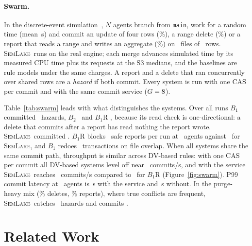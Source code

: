 \documentclass[sigconf, nonacm]{acmart}
\newcommand{\systemname}{\textsc{SemLake}}
\begin{document}
\paragraph{Swarm.} In the discrete-event simulation~\cite{git4data2026, ang2026branchbench, zhou2026chronos, lyu2026atr}, $N$ agents branch from \texttt{main}, work for a random time (mean \SwarmWorkMean\,s) and commit an update of four rows (\SwarmUpdatePct\%), a range delete (\SwarmDeletePct\%) or a report that reads a range and writes an aggregate (\SwarmReportPct\%) on \SwarmFiles\ files of \SwarmRowsPerFile\ rows. \systemname\ runs on the real engine; each merge advances simulated time by its measured CPU time plus its requests at the S3 medians, and the baselines are rule models under the same charges. A report and a delete that ran concurrently over shared rows are a \emph{hazard} if both commit. Every system is run with one CAS per commit and with the same commit service ($G = 8$).

Table~\ref{tab:swarm} leads with what distinguishes the systems. Over all runs $B_1$ committed \SwarmBoneHazTotal\ hazards, $B_2$ \SwarmBtwoHazTotal\ and $B_1\text{R}$ \SwarmBoneRHazTotal, because its read check is one-directional: a delete that commits after a report has read nothing the report wrote. \systemname\ committed \textbf{\SwarmSemHazTotal}. $B_1\text{R}$ blocks \SwarmBoneRFBMax\ safe reports per run at \SwarmMaxAgents\ agents against \SwarmSemFBMax\ for \systemname, and $B_1$ redoes \SwarmBoneRedoMax\ transactions on file overlap. When all systems share the same commit path, throughput is similar across DV-based rules: with one CAS per commit all DV-based systems level off near \SwarmSemSixtyFour\ commits/s, and with the service \systemname\ reaches \SwarmGroupSixtyFour\ commits/s compared to \SwarmBoneRGroupSixtyFour\ for $B_1\text{R}$ (Figure~\ref{fig:swarm}). P99 commit latency at \SwarmMaxAgents\ agents is \SwarmSemGroupTailS\,s with the service and \SwarmSemTailS\,s without. In the purge-heavy mix (\SwarmHeavyDeletePct\% deletes, \SwarmHeavyReportPct\% reports), where true conflicts are frequent, \systemname\ catches \SwarmHeavySemCaught\ hazards and commits \SwarmHeavySemHaz.

\section{Related Work}
\label{sec:related}
\end{document}
